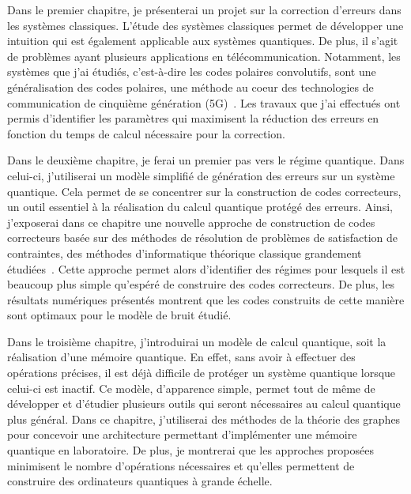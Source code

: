 Dans le premier chapitre,
je présenterai un projet sur la correction d'erreurs dans les systèmes classiques.
L'étude des systèmes classiques permet de développer une intuition qui est également
applicable aux systèmes quantiques.
De plus, il s'agit de problèmes ayant plusieurs applications en télécommunication.
Notamment,
les systèmes que j'ai étudiés,
c'est-à-dire les codes polaires convolutifs,
sont une généralisation des codes polaires,
une méthode au coeur des technologies de communication de cinquième génération (5G)~\cite{arikan_rate_2009, bioglio_design_2021}.
Les travaux que j'ai effectués ont permis d'identifier les paramètres qui maximisent la réduction des erreurs
en fonction du temps de calcul nécessaire pour la correction.

Dans le deuxième chapitre,
je ferai un premier pas vers le régime quantique.
Dans celui-ci,
j'utiliserai un modèle simplifié de génération des erreurs sur un système quantique.
Cela permet de se concentrer sur la construction de codes correcteurs,
un outil essentiel à la réalisation du calcul quantique protégé des erreurs.
Ainsi,
j'exposerai dans ce chapitre une nouvelle approche de construction de codes correcteurs
basée sur des méthodes de résolution de problèmes de satisfaction de contraintes,
des méthodes d'informatique théorique classique grandement étudiées~\cite{arora_computational_2009, noauthor_minizinc_nodate, noauthor_sat_nodate, achlioptas_rigorous_2005}.
Cette approche permet alors d'identifier des régimes pour lesquels il est beaucoup plus simple qu'espéré
de construire des codes correcteurs.
De plus,
les résultats numériques présentés montrent que les codes construits de cette manière
sont optimaux pour le modèle de bruit étudié.

Dans le troisième chapitre,
j'introduirai un modèle de calcul quantique,
soit la réalisation d'une mémoire quantique.
En effet,
sans avoir à effectuer des opérations précises,
il est déjà difficile de protéger un système quantique lorsque celui-ci est inactif.
Ce modèle,
d'apparence simple,
permet tout de même de développer et d'étudier plusieurs outils qui seront nécessaires
au calcul quantique plus général.
Dans ce chapitre,
j'utiliserai des méthodes de la théorie des graphes pour concevoir une architecture 
permettant d'implémenter une mémoire quantique en laboratoire.
De plus,
je montrerai que les approches proposées minimisent le nombre d'opérations nécessaires
et qu'elles permettent de construire des ordinateurs quantiques à grande échelle.

